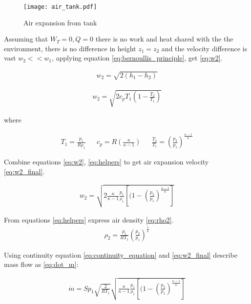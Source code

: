 \begin{figure}[h!]
    \centering
    \texttt{[image: air\_tank.pdf]}
    \caption{Air expansion from tank}
    \label{fig:air_expansion}
\end{figure}

Assuming that $W_T = 0, Q = 0$ there is no work and heat shared with the
the environment, there is no difference in height $z_1 = z_2$ and
the velocity difference is vast $w_2 << w_1$, applying equation
\ref{eq:bernoullis_principle}, get \ref{eq:w2}.


\begin{align}
    w_2 = \sqrt{2(h_1 - h_2)}
    \label{eq:w2}
\end{align}

\begin{align}
    w_2 = \sqrt{2c_p T_1 \left(1-\frac{T_2}{T_1}\right)}
    \label{eq:w2}
\end{align}

where 

\begin{align}
    T_1 = \frac{p_1}{R \rho_1} && 
    c_p = R  \left( \frac{\kappa}{\kappa-1} \right)   &&
    \frac{T_2}{T_1} = \left(\frac{p_2}{p_1} \right)^{\frac{\kappa - 1}{\kappa}}
    \label{eq:helpers}
\end{align}

Combine equations \ref{eq:w2}, \ref{eq:helpers} to get air expansion
velocity \ref{eq:w2_final}.

\begin{align}
    w_2 =
    \sqrt{2 \frac{\kappa}{\kappa-1} \frac{p_1}{\rho_1} 
    \left[(1-\left(\frac{p_2}{p_1}\right)^\frac{\kappa-1}{\kappa}\right]}
    \label{eq:w2_final}
\end{align}

From equations \ref{eq:helpers} express air density \ref{eq:rho2}.
\begin{align}
    \rho_2 = \frac{p_1}{RT_1} \left(\frac{p_2}{p_1}\right)^{\frac{1}{\kappa}}
    \label{eq:rho2}
\end{align}

Using continuity equation \ref{eq:continuity_equation} and
\ref{eq:w2_final} describe mass flow as \ref{eq:dot_m}:

\begin{align}
    \dot{m} = S p_1 \sqrt{\frac{2}{RT_1}}
    \sqrt{\frac{\kappa}{\kappa-1} \frac{p_1}{\rho_1} 
    \left[(1-\left(\frac{p_2}{p_1}\right)^\frac{\kappa-1}{\kappa}\right]}
    \label{eq:dot_m}
\end{align}

